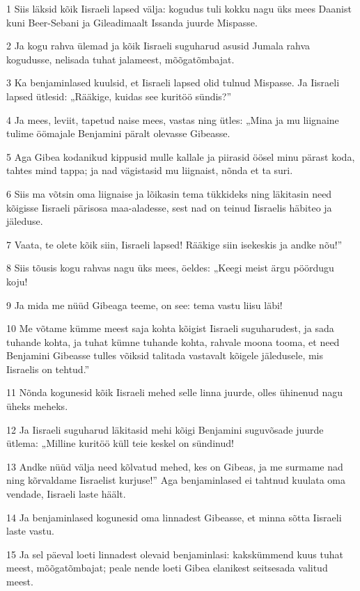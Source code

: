 \par 1 Siis läksid kõik Iisraeli lapsed välja: kogudus tuli kokku nagu üks mees Daanist kuni Beer-Sebani ja Gileadimaalt Issanda juurde Mispasse.
\par 2 Ja kogu rahva ülemad ja kõik Iisraeli suguharud asusid Jumala rahva kogudusse, nelisada tuhat jalameest, mõõgatõmbajat.
\par 3 Ka benjaminlased kuulsid, et Iisraeli lapsed olid tulnud Mispasse. Ja Iisraeli lapsed ütlesid: „Rääkige, kuidas see kuritöö sündis?”
\par 4 Ja mees, leviit, tapetud naise mees, vastas ning ütles: „Mina ja mu liignaine tulime öömajale Benjamini päralt olevasse Gibeasse.
\par 5 Aga Gibea kodanikud kippusid mulle kallale ja piirasid öösel minu pärast koda, tahtes mind tappa; ja nad vägistasid mu liignaist, nõnda et ta suri.
\par 6 Siis ma võtsin oma liignaise ja lõikasin tema tükkideks ning läkitasin need kõigisse Iisraeli pärisosa maa-aladesse, sest nad on teinud Iisraelis häbiteo ja jäleduse.
\par 7 Vaata, te olete kõik siin, Iisraeli lapsed! Rääkige siin isekeskis ja andke nõu!”
\par 8 Siis tõusis kogu rahvas nagu üks mees, öeldes: „Keegi meist ärgu pöördugu koju!
\par 9 Ja mida me nüüd Gibeaga teeme, on see: tema vastu liisu läbi!
\par 10 Me võtame kümme meest saja kohta kõigist Iisraeli suguharudest, ja sada tuhande kohta, ja tuhat kümne tuhande kohta, rahvale moona tooma, et need Benjamini Gibeasse tulles võiksid talitada vastavalt kõigele jäledusele, mis Iisraelis on tehtud.”
\par 11 Nõnda kogunesid kõik Iisraeli mehed selle linna juurde, olles ühinenud nagu üheks meheks.
\par 12 Ja Iisraeli suguharud läkitasid mehi kõigi Benjamini suguvõsade juurde ütlema: „Milline kuritöö küll teie keskel on sündinud!
\par 13 Andke nüüd välja need kõlvatud mehed, kes on Gibeas, ja me surmame nad ning kõrvaldame Iisraelist kurjuse!” Aga benjaminlased ei tahtnud kuulata oma vendade, Iisraeli laste häält.
\par 14 Ja benjaminlased kogunesid oma linnadest Gibeasse, et minna sõtta Iisraeli laste vastu.
\par 15 Ja sel päeval loeti linnadest olevaid benjaminlasi: kakskümmend kuus tuhat meest, mõõgatõmbajat; peale nende loeti Gibea elanikest seitsesada valitud meest.
